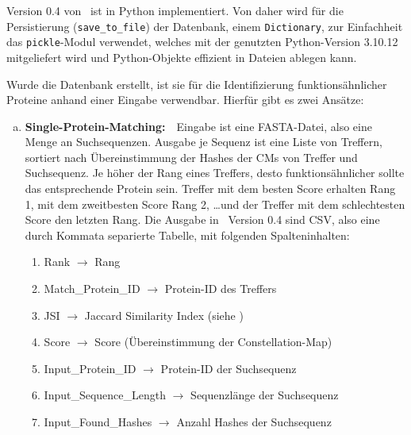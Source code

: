         Version 0.4 von \protfin\ ist in Python implementiert. Von daher wird für die Persistierung (\texttt{save\_to\_file}) der Datenbank, einem \texttt{Dictionary}, zur Einfachheit das \texttt{pickle}-Modul verwendet, welches mit der genutzten Python-Version 3.10.12 mitgeliefert wird und Python-Objekte effizient in Dateien ablegen kann.

        \newpage
        Wurde die Datenbank erstellt, ist sie für die Identifizierung funktionsähnlicher Proteine anhand einer Eingabe verwendbar. Hierfür gibt es zwei Ansätze:
        \begin{enumerate}[a)]
            \item {}
                \textbf{Single-Protein-Matching:}\ \ Eingabe ist eine FASTA-Datei, also eine Menge an Suchsequenzen. Ausgabe je Sequenz ist eine Liste von Treffern, sortiert nach Übereinstimmung der Hashes der \acp{CM} von Treffer und Suchsequenz. Je höher der Rang eines Treffers, desto funktionsähnlicher sollte das entsprechende Protein sein. Treffer mit dem besten Score erhalten Rang 1, mit dem zweitbesten Score Rang 2, \dots und der Treffer mit dem schlechtesten Score den letzten Rang. Die Ausgabe in \protfin\ Version 0.4 sind \ac{CSV}, also eine durch Kommata separierte Tabelle, mit folgenden Spalteninhalten:
                \begin{enumerate}[1.]
                    \item Rank $\rightarrow$ Rang
                    \item Match\_Protein\_ID $\rightarrow$ Protein-ID des Treffers
                    \item JSI $\rightarrow$ Jaccard Similarity Index (siehe )
                    \item Score $\rightarrow$ Score (Übereinstimmung der Constellation-Map)
                    \item Input\_Protein\_ID $\rightarrow$ Protein-ID der Suchsequenz
                    \item Input\_Sequence\_Length $\rightarrow$ Sequenzlänge der Suchsequenz
                    \item Input\_Found\_Hashes $\rightarrow$ Anzahl Hashes der Suchsequenz
                \end{enumerate}


\end{enumerate}

